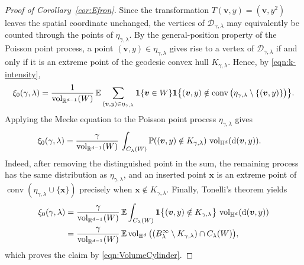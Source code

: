 \documentclass[11pt,a4paper]{article}
\theoremstyle{plain}
\theoremstyle{definition}
\theoremstyle{remark}
\newcommand{\dint}{\textup{d}}
\newcommand{\vol}{\mathop{\mathrm{vol}}\nolimits}
\newcommand{\bx}{\boldsymbol{x}}
\newcommand{\bv}{\boldsymbol{v}}
\def\EE{\mathbb{E}}
\def\HH{\mathbb{H}}
\def\PP{\mathbb{P}}
\def\RR{\mathbb{R}}
\def\cD{\mathcal{D}}
\newcommand{\conv}{\mathop{\mathrm{conv}}\nolimits}
\begin{document}
\begin{proof}[Proof of Corollary~\ref{cor:Efron}]
	Since the transformation
	$T(\bv,y)=(\bv,y^2)$ leaves the spatial coordinate unchanged, the vertices
	of $\cD_{\gamma,\lambda}$ may equivalently be counted through the points
	of $\eta_{\gamma,\lambda}$. By the general-position property of the
	Poisson point process, a point $(\bv,y)\in\eta_{\gamma,\lambda}$ gives rise to a
	vertex of $\cD_{\gamma,\lambda}$ if and only if it is an extreme point of
	the geodesic convex hull $K_{\gamma,\lambda}$. Hence, by \eqref{eqn:k-intensity},
	\[
		\xi_0(\gamma,\lambda)
		=
		\frac{1}{\vol_{\RR^{d-1}}(W)}\,
		\EE\sum_{(\bv,y)\in\eta_{\gamma,\lambda}}
		{\bf 1}\{\bv\in W\}
		{\bf 1}\big\{
		(\bv,y)\notin
		\conv\big(\eta_{\gamma,\lambda}\setminus\{(\bv,y)\}\big)
		\big\}.
	\]
	Applying the Mecke equation to the Poisson point process
	$\eta_{\gamma,\lambda}$ gives
	\[
		\begin{aligned}
			\xi_0(\gamma,\lambda)
			 & =
			\frac{\gamma}{\vol_{\RR^{d-1}}(W)}\,
			\int_{C_\lambda(W)}
			\PP((\bv,y)\notin K_{\gamma,\lambda})
			\,\vol_{\HH^d}(\dint(\bv,y)).
		\end{aligned}
	\]
	Indeed, after removing the distinguished point in the sum, the remaining
	process has the same distribution as $\eta_{\gamma,\lambda}$, and an
	inserted point $\bx$ is an extreme point of
	$\conv(\eta_{\gamma,\lambda}\cup\{\bx\})$ precisely when
	$\bx\notin K_{\gamma,\lambda}$. Finally, Tonelli's theorem yields
	\[
		\begin{aligned}
			\xi_0(\gamma,\lambda)
			 & =
			\frac{\gamma}{\vol_{\RR^{d-1}}(W)}\,
			\EE\int_{C_\lambda(W)}
			{\bf 1}\big\{
			(\bv,y)\notin K_{\gamma,\lambda}
			\big\}
			\,\vol_{\HH^d}(\dint(\bv,y)) \\
			 & =
			\frac{\gamma}{\vol_{\RR^{d-1}}(W)}\,
			\EE\vol_{\HH^d}\big(
			(B_\lambda^\infty\setminus K_{\gamma,\lambda})
			\cap C_\lambda(W)
			\big),
		\end{aligned}
	\]
	which proves the claim by \eqref{eqn:VolumeCylinder}.
\end{proof}
\end{document}
